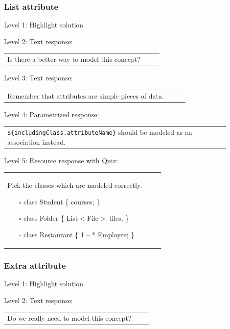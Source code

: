 \subsubsection{List attribute}

\noindent Level 1: Highlight solution \medskip

\noindent Level 2: Text response: \medskip

\begin{tabular}{|p{0.9\linewidth}}
Is there a better way to model this concept?
\end{tabular} \medskip

\noindent Level 3: Text response: \medskip

\begin{tabular}{|p{0.9\linewidth}}
Remember that attributes are simple pieces of data.
\end{tabular} \medskip

\noindent Level 4: Parametrized response: \medskip

\begin{tabular}{|p{0.9\linewidth}}
\verb|${includingClass.attributeName}| should be modeled as an association instead.
\end{tabular} \medskip

\noindent Level 5: Resource response with Quiz: \medskip

\begin{tabular}{|p{0.9\linewidth}}
Pick the classes which are modeled correctly.

\begin{itemize}
    \item[$\square$] class Student \{ courses; \}
    \item[$\square$] class Folder \{ List$<$File$>$ files; \}
    \item[$\square$] class Restaurant \{ 1 -- * Employee; \}
\end{itemize}

\end{tabular} \medskip


\subsubsection{Extra attribute}

\noindent Level 1: Highlight solution \medskip

\noindent Level 2: Text response: \medskip

\begin{tabular}{|p{0.9\linewidth}}
Do we really need to model this concept?
\end{tabular} \medskip

